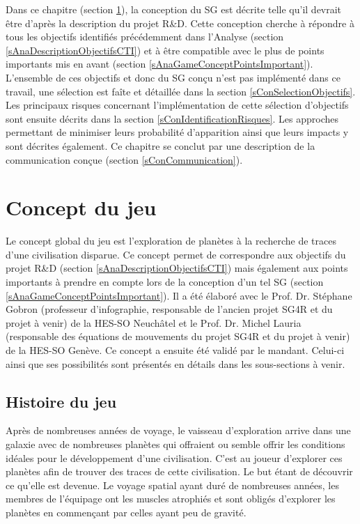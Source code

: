 Dans ce chapitre (section \ref{sConGameConcept}), la conception du SG est décrite telle qu'il devrait être d'après la description du projet R\&D. Cette conception cherche à répondre à tous les objectifs identifiés précédemment dans l'Analyse (section \ref{sAnaDescriptionObjectifsCTI}) et à être compatible avec le plus de points importants mis en avant (section \ref{sAnaGameConceptPointsImportant}). L'ensemble de ces objectifs et donc du SG conçu n'est pas implémenté dans ce travail, une sélection est faîte et détaillée dans la section \ref{sConSelectionObjectifs}. Les principaux risques concernant l'implémentation de cette sélection d'objectifs sont ensuite décrits dans la section \ref{sConIdentificationRisques}. Les approches permettant de minimiser leurs probabilité d'apparition ainsi que leurs impacts y sont décrites également. Ce chapitre se conclut par une description de la communication conçue (section \ref{sConCommunication}).

\section {Concept du jeu}
	\label{sConGameConcept}
	Le concept global du jeu est l'exploration de planètes à la recherche de traces d'une civilisation disparue. Ce concept permet de correspondre aux objectifs du projet R\&D (section \ref{sAnaDescriptionObjectifsCTI}) mais également aux points importants à prendre en compte lors de la conception d'un tel SG (section \ref{sAnaGameConceptPointsImportant}). Il a été élaboré avec le Prof. Dr. Stéphane Gobron (professeur d'infographie, responsable de l'ancien projet SG4R et du projet à venir) de la HES-SO Neuchâtel et le Prof. Dr. Michel Lauria (responsable des équations de mouvements du projet SG4R et du projet à venir) de la HES-SO Genève. Ce concept a ensuite été validé par le mandant. Celui-ci ainsi que ses possibilités sont présentés en détails dans les sous-sections à venir.
	
	\subsection*{Histoire du jeu}	
		Après de nombreuses années de voyage, le vaisseau d'exploration arrive dans une galaxie avec de nombreuses planètes qui offraient ou semble offrir les conditions idéales pour le développement d'une civilisation. C'est au joueur d'explorer ces planètes afin de trouver des traces de cette civilisation. Le but étant de découvrir ce qu'elle est devenue.
		Le voyage spatial ayant duré de nombreuses années, les membres de l'équipage ont les muscles atrophiés et sont obligés d'explorer les planètes en commençant par celles ayant peu de gravité.
	
